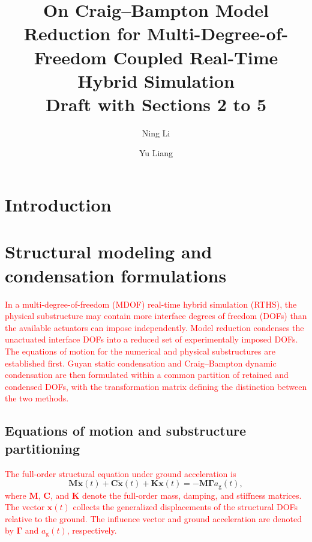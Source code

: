 \documentclass[11pt,a4paper]{article}
\title{On Craig--Bampton Model Reduction for Multi-Degree-of-Freedom Coupled Real-Time Hybrid Simulation\\[4pt]
\large Draft with Sections 2 to 5}
\author{Ning Li \and Yu Liang}
\date{}
\numberwithin{equation}{section}
\newcommand{\rev}[1]{\textcolor{red}{#1}}
\begin{document}
\maketitle

\begin{abstract}
	
\end{abstract}

\section{Introduction} \label{sec1}



\section{Structural modeling and condensation formulations} \label{sec2}

\rev{In a multi-degree-of-freedom (MDOF) real-time hybrid simulation (RTHS), the physical substructure may contain more interface degrees of freedom (DOFs) than the available actuators can impose independently. Model reduction condenses the unactuated interface DOFs into a reduced set of experimentally imposed DOFs. The equations of motion for the numerical and physical substructures are established first. Guyan static condensation and Craig--Bampton dynamic condensation are then formulated within a common partition of retained and condensed DOFs, with the transformation matrix defining the distinction between the two methods.}

\subsection{Equations of motion and substructure partitioning}
\rev{The full-order structural equation under ground acceleration is}
\begin{equation}
	\mathbf{M}\ddot{\bm{x}}(t)+\mathbf{C}\dot{\bm{x}}(t)+\mathbf{K}\bm{x}(t)
	=-\mathbf{M}\bm{\Gamma}a_{\mathrm{g}}(t),
	\label{eq:full-order-eom}
\end{equation}
\rev{where \(\mathbf{M}\), \(\mathbf{C}\), and \(\mathbf{K}\) denote the full-order mass, damping, and stiffness matrices. The vector \(\bm{x}(t)\) collects the generalized displacements of the structural DOFs relative to the ground. The influence vector and ground acceleration are denoted by \(\bm{\Gamma}\) and \(a_{\mathrm{g}}(t)\), respectively.}
\end{document}

